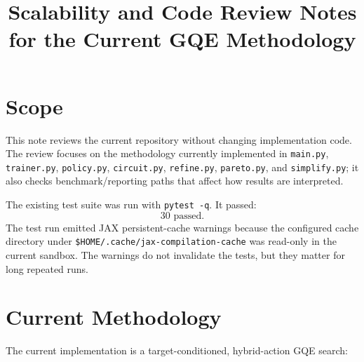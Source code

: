 \documentclass[11pt]{article}
\title{Scalability and Code Review Notes for the Current GQE Methodology}
\author{}
\date{}
\begin{document}
\maketitle

\section{Scope}

This note reviews the current repository without changing implementation code.  The
review focuses on the methodology currently implemented in
\texttt{main.py}, \texttt{trainer.py}, \texttt{policy.py},
\texttt{circuit.py}, \texttt{refine.py}, \texttt{pareto.py}, and
\texttt{simplify.py}; it also checks benchmark/reporting paths that affect how
results are interpreted.

The existing test suite was run with \texttt{pytest -q}.  It passed:
\[
  30 \text{ passed.}
\]
The test run emitted JAX persistent-cache warnings because the configured cache
directory under \texttt{\$HOME/.cache/jax-compilation-cache} was read-only in the
current sandbox.  The warnings do not invalidate the tests, but they matter for
long repeated runs.

\section{Current Methodology}

The current implementation is a target-conditioned, hybrid-action GQE search:
\end{document}
